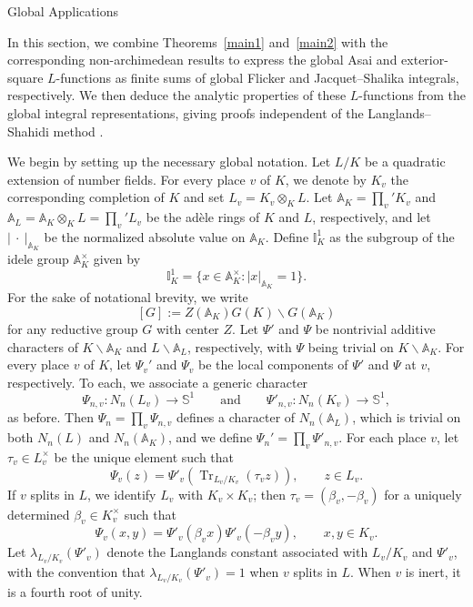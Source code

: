 \documentclass[12pt,reqno]{amsart}
\numberwithin{equation}{section}%
\numberwithin{equation}{subsection}
\theoremstyle{definition}
\theoremstyle{remark}
\begin{document}
\begin{section}{Global Applications}\label{s7}

In this section, we combine Theorems~\ref{main1} and~\ref{main2} with
the corresponding non-archimedean results to express the global Asai
and exterior-square \(L\)-functions as finite sums of global Flicker
and Jacquet--Shalika integrals, respectively. We then deduce the
analytic properties of these \(L\)-functions from the global integral
representations, giving proofs independent of the Langlands--Shahidi
method \cite{Shahidi2010}.

We begin by setting up the necessary global notation. Let \(L/K\) be a quadratic extension of number fields. For every place \(v\) of \(K\), we denote by \(K_v\) the corresponding completion of \(K\) and set
\(L_v=K_v\otimes_K L\). Let
\(\mathbb{A}_K=\prod_v' K_v\) and
\(\mathbb{A}_L=\mathbb{A}_K\otimes_K L=\prod_v' L_v\) be the ad\`ele rings of
\(K\) and \(L\), respectively, and let \(\lvert\>\cdot\>\rvert_{\mathbb{A}_K}\)
be the normalized absolute value on \(\mathbb{A}_K\). Define
\(\mathbb{I}_K^1\) as the subgroup of the idele group \(\mathbb{A}_K^\times\)
given by
\[
  \mathbb{I}_K^1
  =
  \bigl\{x\in\mathbb{A}_K^\times:
  \lvert x\rvert_{\mathbb{A}_K}=1\bigr\}.
\]
For the sake of notational brevity, we write
\[
  [G]:=Z(\mathbb{A}_K)G(K)\backslash G(\mathbb{A}_K)
\]
for any reductive group \(G\) with center \(Z\). Let \(\Psi'\) and \(\Psi\)
be nontrivial additive characters of \(K\backslash\mathbb{A}_K\) and
\(L\backslash\mathbb{A}_L\), respectively, with \(\Psi\) being trivial on
\(K\backslash\mathbb{A}_K\). For every place \(v\) of \(K\), let \(\Psi_v'\)
and \(\Psi_v\) be the local components of \(\Psi'\) and \(\Psi\) at \(v\),
respectively. To each, we associate a generic character
\[
  \Psi_{n,v}:N_n(L_v)\longrightarrow\mathbb{S}^1
  \qquad\text{and}\qquad
  \Psi'_{n,v}:N_n(K_v)\longrightarrow\mathbb{S}^1,
\]
as before. Then \(\Psi_n=\prod_v\Psi_{n,v}\) defines a character of
\(N_n(\mathbb{A}_L)\), which is trivial on both \(N_n(L)\) and
\(N_n(\mathbb{A}_K)\), and we define
\(\Psi_n'=\prod_v\Psi'_{n,v}\). For each place \(v\), let \(\tau_v\in L_v^\times\) be the unique element
such that
\[
  \Psi_v(z)
  =
  \Psi'_v\!\left(\operatorname{Tr}_{L_v/K_v}(\tau_v z)\right),
  \qquad z\in L_v.
\]
If \(v\) splits in \(L\), we
identify \(L_v\) with \(K_v\times K_v\); then
$ \tau_v=(\beta_v,-\beta_v) $
for a uniquely determined \(\beta_v\in K_v^\times\) such that
\[
  \Psi_v(x,y)
  =
  \Psi'_v(\beta_vx)\Psi'_v(-\beta_vy),
  \qquad x,y\in K_v.
\]
Let \(\lambda_{L_v/K_v}(\Psi'_v)\) denote the Langlands constant
associated with \(L_v/K_v\) and \(\Psi'_v\), with the convention that
\(\lambda_{L_v/K_v}(\Psi'_v)=1\) when \(v\) splits in \(L\). When \(v\)
is inert, it is a fourth root of unity.


\end{section}
\end{document}
